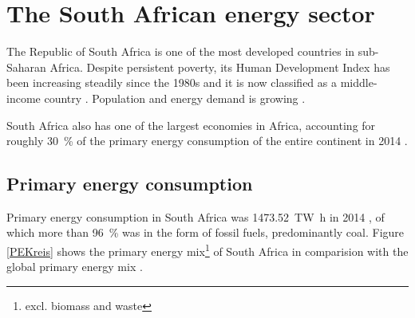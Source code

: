 \chapter{The South African energy sector}
The Republic of South Africa is one of the most developed countries in sub-Saharan Africa. Despite persistent poverty, its Human Development Index has been increasing steadily since the 1980s and it is now classified as a middle-income country \cite{UNDP2015}. Population and energy demand is growing \cite{TheWorldBank2015,Agency2015}.

South Africa also has one of the largest economies in Africa, accounting for roughly \SI{30}{\percent} of the primary energy consumption of the entire continent in 2014 \cite{BP2015b}.

\section{Primary energy consumption}

Primary energy consumption in South Africa was \SI{1473.52}{\tera\watt\hour} in 2014 \cite{BP2015b}, of which more than \SI{96}{\percent} was in the form of fossil fuels, predominantly coal. Figure \ref{PEKreis} shows the primary energy mix\footnote{excl. biomass and waste} of South Africa in comparision with the global primary energy mix \cite{BP2015b}.

